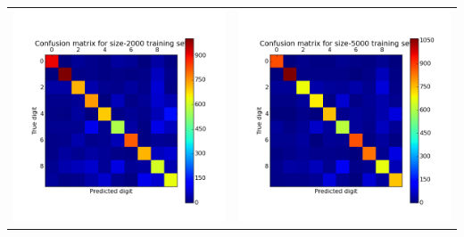 \documentclass[11pt]{article}
\begin{document}
\newpage
\begin{tabular}{cc}
\includegraphics[scale=0.5]{images/confusion_matrix_2000} & \includegraphics[scale=0.5]{images/confusion_matrix_5000} \\

\end{tabular}
\end{document}
